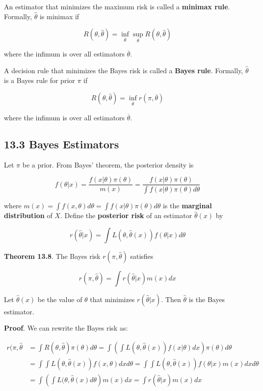 An estimator that minimizes the maximum risk is called a \textbf{minimax
rule}. Formally, \(\hat{\theta}\) is minimax if

\[R(\theta, \hat{\theta}) = \inf_{\overline{\theta}} \sup_\theta R(\theta, \hat{\theta})\]

where the infimum is over all estimators \(\overline{\theta}\).

A decision rule that minimizes the Bayes risk is called a \textbf{Bayes
rule}. Formally, \(\hat{\theta}\) is a Bayes rule for prior \(\pi\) if

\[R(\theta, \hat{\theta}) = \inf_{\overline{\theta}} r(\pi, \overline{\theta})\]

where the infimum is over all estimators \(\overline{\theta}\).

\subsection{13.3 Bayes Estimators}\label{bayes-estimators}

Let \(\pi\) be a prior. From Bayes' theorem, the posterior density is

\[f(\theta | x) = \frac{f(x | \theta) \pi(\theta)}{m(x)} = \frac{f(x | \theta) \pi(\theta)}{\int f(x | \theta) \pi(\theta) d\theta} \]

where
\(m(x) = \int f(x, \theta) d\theta = \int f(x | \theta) \pi(\theta) d\theta\)
is the \textbf{marginal distribution} of \(X\). Define the
\textbf{posterior risk} of an estimator \(\hat{\theta}(x)\) by

\[r(\hat{\theta} | x) = \int L(\theta, \hat{\theta}(x)) f(\theta | x) d\theta\]

\textbf{Theorem 13.8}. The Bayes risk \(r(\pi, \hat{\theta})\) satisfies

\[r(\pi, \hat{\theta}) = \int r(\hat{\theta} | x) m(x) dx\]

Let \(\hat{\theta}(x)\) be the value of \(\theta\) that minimizes
\(r(\hat{\theta} | x)\). Then \(\hat{\theta}\) is the Bayes estimator.

\textbf{Proof}. We can rewrite the Bayes risk as:

\begin{align}
r(\pi, \hat{\theta} &= \int R(\theta, \hat{\theta}) \pi(\theta) d\theta = \int \left( \int L(\theta, \hat{\theta}(x)) f(x | \theta) dx \right) \pi(\theta) d\theta \\
&= \int \int L(\theta, \hat{\theta}(x)) f(x, \theta) dx d\theta = \int \int L(\theta, \hat{\theta}(x)) f(\theta | x) m(x) dx d\theta \\
&= \int \left(\int L(\theta, \hat{\theta}(x) d\theta \right) m(x) dx = \int r(\hat{\theta} | x) m(x) dx
\end{align}

